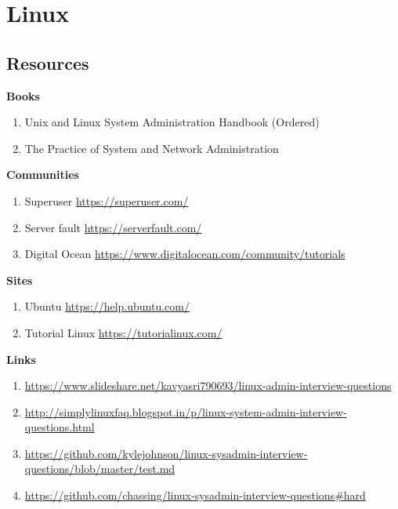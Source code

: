 \documentclass{notes}
\begin{document}
\tableofcontents
\chapter{Linux}
\section{Resources}
	\textbf{Books}
		\begin{enumerate}
			\item Unix and Linux System Administration Handbook (Ordered)
			\item The Practice of System and Network Administration
		\end{enumerate}
	\textbf{Communities}
		\begin{enumerate}
			\item Superuser \ra \url{https://superuser.com/}
			\item Server fault \ra \url{https://serverfault.com/}
			\item Digital Ocean \ra \url{https://www.digitalocean.com/community/tutorials}
		\end{enumerate}
	\textbf{Sites}
		\begin{enumerate}
			\item Ubuntu \ra \url{https://help.ubuntu.com/}
			\item Tutorial Linux \ra \url{https://tutorialinux.com/}
		\end{enumerate}
	\textbf{Links}
		\begin{enumerate}
			\item \url{https://www.slideshare.net/kavyasri790693/linux-admin-interview-questions}
			\item \url{http://simplylinuxfaq.blogspot.in/p/linux-system-admin-interview-questions.html}
			\item \url{https://github.com/kylejohnson/linux-sysadmin-interview-questions/blob/master/test.md}
			\item \url{https://github.com/chassing/linux-sysadmin-interview-questions#hard}
		\end{enumerate}

\newpage
\end{document}
